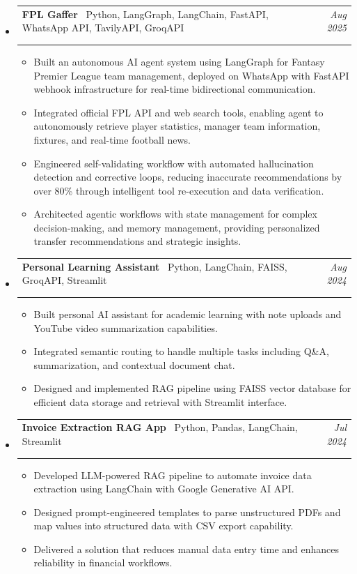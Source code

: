 \documentclass[11pt,a4paper]{article}
\makeatletter
\newcommand{\resumeProjectHeading}[4]{
  \vspace{2pt}
  \item[]
    \begin{tabular*}{\textwidth}[t]{@{\hspace{0pt}}p{0.82\textwidth}@{\extracolsep{\fill}}r}
      \textbf{#1} {\small\textbar\ #2} & \textit{#3} \\
      \if\relax\detokenize{#4}\relax\else
        \multicolumn{2}{l}{\footnotesize\color{gray!70}\faGithub\ \href{#4}{#4}} \\
      \fi
    \end{tabular*}
  \vspace{-8pt}
}
\makeatother
\begin{document}
\begin{itemize}[leftmargin=0pt, label={}]

\resumeProjectHeading
  {FPL Gaffer}{Python, LangGraph, LangChain, FastAPI, WhatsApp API, TavilyAPI, GroqAPI}{Aug 2025}{https://github.com/DejusDevspace/fpl-gaffer}
  \begin{itemize}[leftmargin=15pt, label=\textbullet]
    \item Built an autonomous AI agent system using LangGraph for Fantasy Premier League team management, deployed on WhatsApp with FastAPI webhook infrastructure for real-time bidirectional communication.
    \item Integrated official FPL API and web search tools, enabling agent to autonomously retrieve player statistics, manager team information, fixtures, and real-time football news.
    \item Engineered self-validating workflow with automated hallucination detection and corrective loops, reducing inaccurate recommendations by over 80\% through intelligent tool re-execution and data verification.
    \item Architected agentic workflows with state management for complex decision-making, and memory management, providing personalized transfer recommendations and strategic insights.
  \end{itemize}

\resumeProjectHeading
  {Personal Learning Assistant}{Python, LangChain, FAISS, GroqAPI, Streamlit}{Aug 2024}{https://github.com/DejusDevspace/Personal-Leaning-Assistant-Q-A-Conversational-Chatbot}
  \begin{itemize}[leftmargin=15pt, label=\textbullet]
    \item Built personal AI assistant for academic learning with note uploads and YouTube video summarization capabilities.
    \item Integrated semantic routing to handle multiple tasks including Q\&A, summarization, and contextual document chat.
    \item Designed and implemented RAG pipeline using FAISS vector database for efficient data storage and retrieval with Streamlit interface.
  \end{itemize}

\resumeProjectHeading
  {Invoice Extraction RAG App}{Python, Pandas, LangChain, Streamlit}{Jul 2024}{https://github.com/DejusDevspace/Invoice-Extraction-RAG-application}
  \begin{itemize}[leftmargin=15pt, label=\textbullet]
    \item Developed LLM-powered RAG pipeline to automate invoice data extraction using LangChain with Google Generative AI API.
    \item Designed prompt-engineered templates to parse unstructured PDFs and map values into structured data with CSV export capability.
    \item Delivered a solution that reduces manual data entry time and enhances reliability in financial workflows.
  \end{itemize}


\end{itemize}
\end{document}
